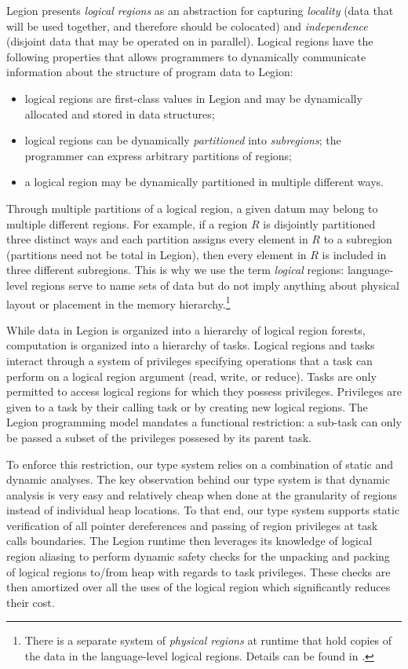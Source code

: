 Legion presents {\em logical regions} as an
abstraction for capturing {\em locality} (data that will be used together,
and therefore should be colocated) and {\em independence} (disjoint data
that may be operated on in parallel).  Logical regions have the following
properties that allows programmers to dynamically communicate information
about the structure of program data to Legion:
\begin{itemize}
\item  logical regions are first-class values in Legion
and may be dynamically allocated and stored in data structures;

\item logical regions can be dynamically {\em partitioned} into {\em subregions}; 
the programmer can express arbitrary partitions of regions;

\item  a logical region may be dynamically partitioned in multiple different ways.
\end{itemize}
Through multiple partitions
of a logical region, a given datum may belong to multiple different regions.  
For example, if a region $R$ is disjointly partitioned three distinct ways 
and each partition assigns every element in $R$ to a
subregion (partitions need not be total in Legion), then every element
in $R$ is included in three different subregions.  This is why we use
the term {\em logical} regions: language-level regions serve to name
sets of data but do not imply anything about physical layout or placement
in the memory hierarchy.\footnote{There
is a separate system of {\em physical regions} at runtime that hold
copies of the data in the language-level logical regions.  Details can
be found in \cite{Legion12}.}

While data in Legion is organized into a hierarchy of logical region forests, 
computation is organized into a hierarchy of tasks.  Logical regions and tasks interact
through a system of privileges specifying operations that a task
can perform on a logical region argument (read, write, or reduce).  
Tasks are only permitted to access logical regions for which they 
possess privileges.  Privileges are given to a task by their calling task
or by creating new logical regions.  The Legion programming model 
mandates a functional restriction: a sub-task can only be passed a subset
of the privileges possesed by its parent task.  

To enforce this restriction, our type system relies on a combination of static 
and dynamic analyses.  The key observation behind our type system is that dynamic
analysis is very easy and relatively cheap when done at the granularity of
regions instead of individual heap locations.  To that end, our type system supports
static verification of all pointer dereferences and passing of region privileges at 
task calls boundaries.  The Legion runtime then leverages its knowledge of logical
region aliasing to perform dynamic safety checks for the unpacking
and packing of logical regions to/from heap with regards to task privileges.  
These checks are then amortized over all the uses of the logical region 
which significantly reduces their cost.

